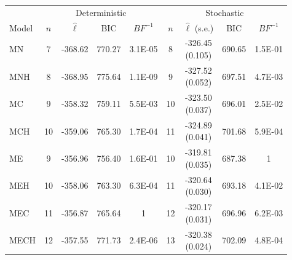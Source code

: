 \begin{table}[h!]
\centering
\small
\begin{tabular}{lcccccccc}
  \toprule
  & \multicolumn{4}{c}{Deterministic} & \multicolumn{4}{c}{Stochastic} \\
    \cmidrule(rl){2-5}\cmidrule(rl){6-9}
  Model & $n$ & $\hat{\ell}$ & BIC & ${BF}^{-1}$ & $n$ & \makecell{$\hat{\ell}$ \vspace{-.1cm} \\ \scriptsize{(s.e.)}}  & BIC  & $BF^{-1}$ \\ 
  \cmidrule(rl){2-5}\cmidrule(rl){6-9}
  \textsc{MN} &   7 & -368.62 & 770.27 & 3.1E-05 &   8 & \makecell{-326.45 \vspace{-.1cm} \\ \scriptsize{(0.105)}} & 690.65 & 1.5E-01 \\ 
   \textsc{MNH} &   8 & -368.95 & 775.64 & 1.1E-09 &   9 & \makecell{-327.52\vspace{-.1cm} \\ \scriptsize{(0.052)}} & 697.51 & 4.7E-03 \\ 
   \textsc{MC} &   9 & -358.32 & 759.11 & 5.5E-03 &  10 & \makecell{-323.50\vspace{-.1cm} \\ \scriptsize{(0.037)}} & 696.01 & 2.5E-02 \\ 
   \textsc{MCH} &  10 & -359.06 & 765.30 & 1.7E-04 &  11 & \makecell{-324.89\vspace{-.1cm} \\ \scriptsize{(0.041)}} & 701.68 & 5.9E-04 \\ 
   \textsc{ME} &   9 & -356.96 & \textsc{756.40} & 1.6E-01 &  10 & \makecell{\textsc{-319.81}\vspace{-.1cm} \\ \scriptsize{(0.035)}} & \textsc{687.38} & \textsc{1} \\ 
   \textsc{MEH} &  10 & -358.06 & 763.30 & 6.3E-04 &  11 & \makecell{-320.64\vspace{-.1cm} \\ \scriptsize{(0.030)}} & 693.18 & 4.1E-02 \\ 
   \textsc{MEC} &  11 & \textsc{-356.87} & 765.64 & \textsc{1} &  12 & \makecell{-320.17\vspace{-.1cm} \\ \scriptsize{(0.031)}} & 696.96 & 6.2E-03 \\ 
   \textsc{MECH} &  12 & -357.55 & 771.73 & 2.4E-06 &  13 & \makecell{-320.38\vspace{-.1cm} \\ \scriptsize{(0.024)}} & 702.09 & 4.8E-04 \\ 

\end{tabular}
\end{table}
